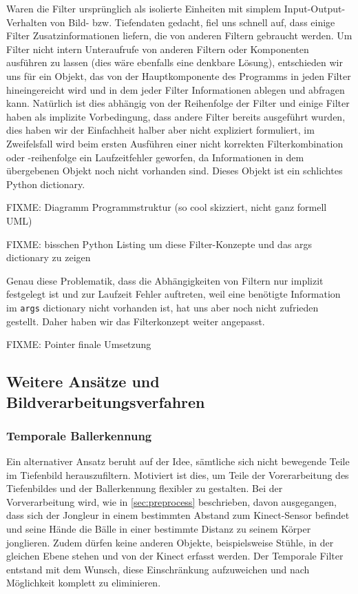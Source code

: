 \documentclass[12pt,a4paper,ngerman]{scrartcl}
\begin{document}
Waren die Filter ursprünglich als isolierte Einheiten mit simplem
Input-Output-Verhalten von Bild- bzw. Tiefendaten gedacht, fiel uns schnell auf,
dass einige Filter Zusatzinformationen liefern, die von anderen Filtern gebraucht
werden. Um Filter nicht intern Unteraufrufe von anderen Filtern oder Komponenten
ausführen zu lassen (dies wäre ebenfalls eine denkbare Lösung), entschieden wir uns
für ein Objekt, das von der Hauptkomponente des Programms in jeden Filter
hineingereicht wird und in dem jeder Filter Informationen ablegen und abfragen kann.
Natürlich ist dies abhängig von der Reihenfolge der Filter und einige Filter haben
als implizite Vorbedingung, dass andere Filter bereits ausgeführt wurden, dies haben
wir der Einfachheit halber aber nicht expliziert formuliert, im Zweifelsfall wird
beim ersten Ausführen einer nicht korrekten Filterkombination oder -reihenfolge ein
Laufzeitfehler geworfen, da Informationen in dem übergebenen Objekt noch nicht
vorhanden sind. Dieses Objekt ist ein schlichtes Python dictionary.


{\color{red} FIXME: Diagramm Programmstruktur (so cool skizziert, nicht ganz formell UML)}

{\color{red} FIXME: bisschen Python Listing um diese Filter-Konzepte und das args dictionary zu zeigen}

Genau diese Problematik, dass die Abhängigkeiten von Filtern nur implizit festgelegt
ist und zur Laufzeit Fehler auftreten, weil eine benötigte Information im
\lstinline{args} dictionary nicht vorhanden ist, hat uns aber noch nicht zufrieden
gestellt. Daher haben wir das Filterkonzept weiter angepasst.

FIXME: Pointer finale Umsetzung

\subsection{Weitere Ansätze und Bildverarbeitungsverfahren}

\subsubsection{Temporale Ballerkennung}
\label{sec:temporal}

Ein alternativer Ansatz beruht auf der Idee, sämtliche sich nicht bewegende Teile im Tiefenbild herauszufiltern. Motiviert ist dies, um Teile der Vorerarbeitung des Tiefenbildes und der Ballerkennung flexibler zu gestalten. Bei der Vorverarbeitung wird, wie in \ref{sec:preprocess} beschrieben, davon ausgegangen, dass sich der Jongleur in einem bestimmten Abstand zum Kinect-Sensor befindet und seine Hände  die Bälle in einer bestimmte Distanz zu seinem Körper jonglieren. Zudem dürfen keine anderen Objekte,
beispielsweise Stühle, in der gleichen Ebene stehen und von der Kinect erfasst werden.
Der Temporale Filter entstand mit dem Wunsch, diese Einschränkung aufzuweichen und nach Möglichkeit komplett zu eliminieren.
\end{document}
